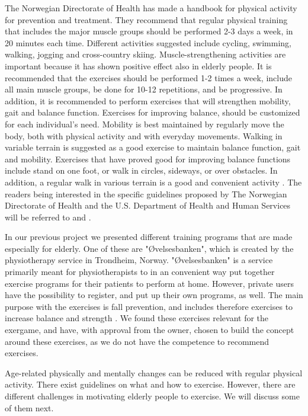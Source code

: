 The Norwegian Directorate of Health has made a handbook for physical activity for prevention and treatment. They recommend that regular physical training that includes the major muscle groups should be performed 2-3 days a week, in 20 minutes each time. Different activities suggested include cycling, swimming, walking, jogging and cross-country skiing. Muscle-strengthening activities are important because it has shown positive effect also in elderly people. It is recommended that the exercises should be performed 1-2 times a week, include all main muscle groups, be done for 10-12 repetitions, and be progressive.  In addition, it is recommended to perform exercises that will strengthen mobility, gait and balance function. Exercises for improving balance, should be customized for each individual's need. Mobility is best maintained by regularly move the body, both with physical activity and with everyday movements. Walking in variable terrain is suggested as a good exercise to maintain balance function, gait and mobility. Exercises that have proved good for improving balance functions include stand on one foot, or walk in circles, sideways, or over obstacles. In addition, a regular walk in various terrain is a good and convenient activity \cite{aktivitetsbok}.  The readers being interested in the specific guidelines proposed by The Norwegian Directorate of Health and the U.S. Department of Health and Human Services will be referred to  \cite{aktivitetsbok} and \cite{guidelines}. 

In our previous project \cite{project} we presented different training programs that are made especially for elderly. One of these are "Øvelsesbanken", which is created by the physiotherapy service in Trondheim, Norway.  "Øvelsesbanken" is a service primarily meant for physiotherapists to in an convenient way put together exercise programs for their patients to perform at home. However, private users have the possibility to register, and put up their own programs, as well. The main purpose with the exercises is fall prevention, and includes therefore exercises to increase balance and strength \cite{eldretrening}. We found these exercises relevant for the exergame, and have, with approval from the owner, chosen to build the concept around these exercises, as we do not have the competence to recommend exercises.

Age-related physically and mentally changes can be reduced with regular physical activity. There exist guidelines on what and how to exercise. However, there are different challenges in motivating elderly people to exercise. We will discuss some of them next. 

